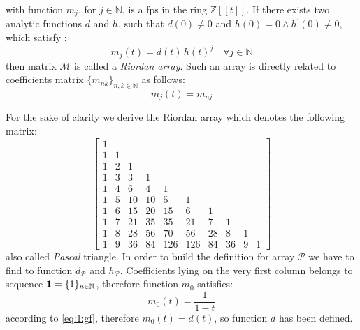 with function $m_{j}$, for $j\in\mathbb{N}$, is a \ac{fps} in the ring 
$\mathbb{Z}[\![t]\!]$. If there exists two analytic functions $d$
and $h$, such that $d(0)\neq0$ and $h(0)=0 \wedge h^{\prime}(0)\neq0$, which
satisfy :
\begin{displaymath}
    m_{j}(t)=d(t)\,h(t)^{j} \quad \forall j\in\mathbb{N}
\end{displaymath}
then matrix $\mathcal{M}$ is called a \emph{Riordan array}. Such an array is
directly related to coefficients matrix $\lbrace m_{nk}\rbrace_{n,k\in\mathbb{N}}$ as follows:
\begin{displaymath}
    [t^{n}]m_{j}(t)=m_{nj}
\end{displaymath}

For the sake of clarity we derive the Riordan array which denotes the
following matrix:
    \begin{displaymath} 
        \left[
        \begin{array}{rrrrrrrrrr}
        1 &  &  &  &  &  &  &  &  &  \\
        1 & 1 &  &  &  &  &  &  &  &  \\
        1 & 2 & 1 &  &  &  &  &  &  &  \\
        1 & 3 & 3 & 1 &  &  &  &  &  &  \\
        1 & 4 & 6 & 4 & 1 &  &  &  &  &  \\
        1 & 5 & 10 & 10 & 5 & 1 &  &  &  &  \\
        1 & 6 & 15 & 20 & 15 & 6 & 1 &  &  &  \\
        1 & 7 & 21 & 35 & 35 & 21 & 7 & 1 &  &  \\
        1 & 8 & 28 & 56 & 70 & 56 & 28 & 8 & 1 &  \\
        1 & 9 & 36 & 84 & 126 & 126 & 84 & 36 & 9 & 1
        \end{array}
        \right] 
    \end{displaymath}
also called \emph{Pascal} triangle. In order to build the definition for array
$\mathcal{P}$ we have to find to function $d_{\mathcal{P}}$ and
$h_{\mathcal{P}}$. Coefficients lying on the very first column belongs to 
sequence $\boldsymbol{1}=\lbrace1\rbrace_{n\in\mathbb{N}}$, therefore function $m_{0}$
satisfies:
\begin{displaymath}
    m_{0}(t)=\frac{1}{1-t}
\end{displaymath}
according to \autoref{eq:1:gf}, therefore $m_{0}(t)=d(t)$, so function $d$ has been
defined. 


